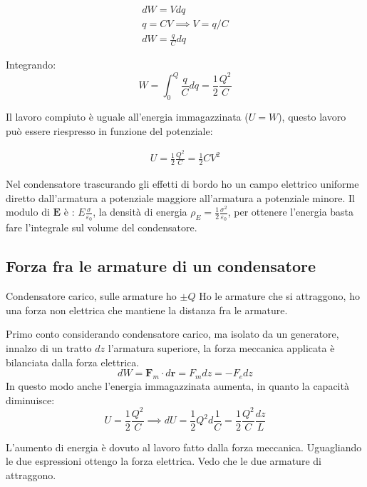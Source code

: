 \documentclass[a4paper]{scrarticle}
\begin{document}
\begin{gather*}
    dW = V dq\\
    q = CV\implies V = q/C \\
    dW = \frac{q}{C} dq    
\end{gather*}

Integrando:
\begin{equation}
    W = \int_{0}^{Q} \frac{q}{C} dq = \frac{1}{2}\frac{Q^2}{C}
\end{equation}

Il lavoro compiuto è uguale all'energia immagazzinata ($U  = W$), questo lavoro può essere riespresso in funzione del potenziale:

\begin{gather*}
    U = \frac{1}{2} \frac{Q^2}{C} = \frac{1}{2} CV^2
\end{gather*}

Nel condensatore trascurando gli effetti di bordo ho un campo elettrico uniforme diretto dall'armatura a potenziale maggiore all'armatura a potenziale minore.
Il modulo di $\bm E$ è : $E \frac{\sigma}{\varepsilon_0}$, la densità di energia $\rho_E = \frac{1}{2}\frac{\sigma^2}{\varepsilon_0}$, per ottenere l'energia basta fare l'integrale sul volume del condensatore.

\subsection{Forza fra le armature di un condensatore}

Condensatore carico, sulle armature ho $\pm Q$
Ho le armature che si attraggono, ho una forza non elettrica che mantiene la distanza fra le armature.

Primo conto considerando condensatore carico, ma isolato da un generatore, innalzo di un tratto $dz$ l'armatura superiore, la forza meccanica applicata è bilanciata dalla forza elettrica.
\begin{equation*}
    dW = \bm F_m \cdot d\bm r = F_m dz = - F_e dz
\end{equation*}
In questo modo anche l'energia immagazzinata aumenta, in quanto la capacità diminuisce:
\begin{equation*}
    U = \frac{1}{2}\frac{Q^2}{C} \implies dU = \frac{1}{2}Q^2 d \frac{1}{C} = \frac{1}{2}\frac{Q^2}{C}\frac{dz}{L}
\end{equation*}

L'aumento di energia è dovuto al lavoro fatto dalla forza meccanica. Uguagliando le due espressioni ottengo la forza elettrica.
Vedo che le due armature di attraggono.
\end{document}
